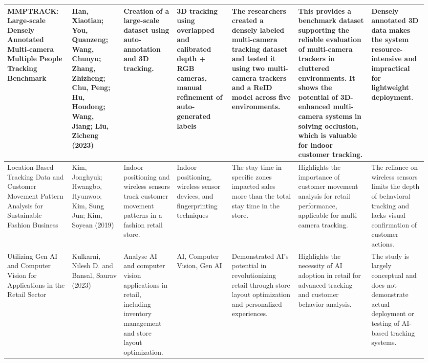 {\begin{landscape}
\begin{longtable}{|p{2.5cm}|p{2.5cm}|p{2.7cm}|p{2.7cm}|p{2.5cm}|p{2.5cm}|p{2.5cm}|}
		MMPTRACK: Large-scale Densely Annotated Multi-camera Multiple People Tracking Benchmark
		& Han, Xiaotian; You, Quanzeng; Wang, Chunyu; Zhang, Zhizheng; Chu, Peng; Hu, Houdong; Wang, Jiang; Liu, Zicheng (2023)
		& Creation of a large-scale dataset using auto-annotation and 3D tracking.
		& 3D tracking using overlapped and calibrated depth + RGB cameras, manual refinement of auto-generated labels
		& The researchers created a densely labeled multi-camera tracking dataset and tested it using two multi-camera trackers and a ReID model across five environments.
		& This provides a benchmark dataset supporting the reliable evaluation of multi-camera trackers in cluttered environments. It shows the potential of 3D-enhanced multi-camera systems in solving occlusion, which is valuable for indoor customer tracking.
		& Densely annotated 3D data makes the system resource-intensive and impractical for lightweight deployment. \\
		\hline
		
		\pagebreak
		
		Location-Based Tracking Data and Customer Movement Pattern Analysis for Sustainable Fashion Business
		& Kim, Jonghyuk; Hwangbo, Hyunwoo; Kim, Sung Jun; Kim, Soyean (2019)
		& Indoor positioning and wireless sensors track customer movement patterns in a fashion retail store.
		& Indoor positioning, wireless sensor devices, and fingerprinting techniques
		& The stay time in specific zones impacted sales more than the total stay time in the store.
		& Highlights the importance of customer movement analysis for retail performance, applicable for multi-camera tracking.
		& The reliance on wireless sensors limits the depth of behavioral tracking and lacks visual confirmation of customer actions. \\
		\hline
		
		Utilizing Gen AI and Computer Vision for Applications in the Retail Sector
		& Kulkarni, Nilesh D. and Bansal, Saurav (2023)
		& Analyse AI and computer vision applications in retail, including inventory management and store layout optimization.
		& AI, Computer Vision, Gen AI
		& Demonstrated AI's potential in revolutionizing retail through store layout optimization and personalized experiences.
		& Highlights the necessity of AI adoption in retail for advanced tracking and customer behavior analysis.
		& The study is largely conceptual and does not demonstrate actual deployment or testing of AI-based tracking systems.\\
		\hline
		

\end{longtable}
\end{landscape}}
